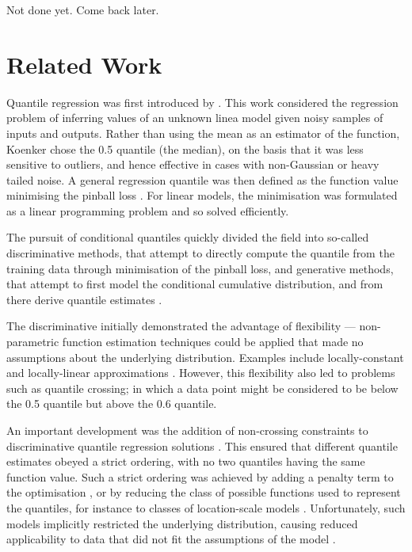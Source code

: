 \documentclass[twoside]{article} \usepackage{aistats2017}
\theoremstyle{definition}
\theoremstyle{remark}
\newcommand{\warn}[1]{{\color{RedOrange} #1}}
\begin{document}
	\warn{Not done yet. Come back later.}
	
\section{Related Work}
\label{sec:related_work}

	Quantile regression was first introduced by \cite{Koenker1978}. This work considered the regression problem of inferring values of an unknown linea model given noisy samples of inputs and outputs. Rather than using the mean as an estimator of the function, Koenker chose the 0.5 quantile (the median), on the basis that it was less sensitive to outliers, and hence effective in cases with non-Gaussian or heavy tailed noise. A general regression quantile was then defined as the function value minimising the pinball loss \citep{Koenker1978}. For linear models, the minimisation was formulated as a linear programming problem and so solved efficiently.

	The pursuit of conditional quantiles quickly divided the field into so-called discriminative methods, that attempt to directly compute the quantile from the training data through minimisation of the pinball loss, and generative methods, that attempt to first model the conditional cumulative distribution, and from there derive quantile estimates \citep{Koenker2005}.

	The discriminative initially demonstrated the advantage of flexibility --- non-parametric function estimation techniques could be applied that made no assumptions about the underlying distribution. Examples include locally-constant and locally-linear approximations \citep{Chaudhuri1991, Yu1998}. However, this flexibility also led to problems such as quantile crossing; in which a data point might be considered to be below the 0.5 quantile but above the 0.6 quantile\cite{Koenker2005}. 

	An important development was the addition of non-crossing constraints to discriminative quantile regression solutions \citep{He1997}. This ensured that different quantile estimates obeyed a strict ordering, with no two quantiles having the same function value. Such a strict ordering was achieved by adding a penalty term to the optimisation \citep{Cole1992}, or by reducing the class of possible functions used to represent the quantiles, for instance to classes of location-scale models \citep{Koenker1984, He1997}. Unfortunately, such models implicitly restricted the underlying distribution, causing reduced applicability to data that did not fit the assumptions of the model \citep{Koenker2005}.
\end{document}
